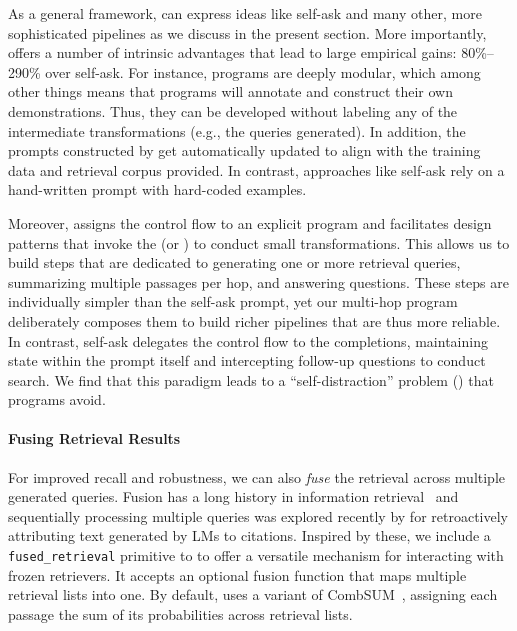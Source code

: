 As a general framework, \DSP can express ideas like self-ask and many other, more sophisticated pipelines as we discuss in the present section. More importantly, \DSP offers a number of intrinsic advantages that lead to large empirical gains: 80\%--290\% over self-ask. For instance, \DSP programs are deeply modular, which among other things means that \DSP programs will annotate and construct their own demonstrations. Thus, they can be developed without labeling any of the intermediate transformations (e.g., the queries generated). In addition, the \LM{} prompts constructed by \DSP get automatically updated to align with the training data and retrieval corpus provided. In contrast, approaches like self-ask rely on a hand-written prompt with hard-coded examples.

Moreover, \DSP assigns the control flow to an explicit program and facilitates design patterns that invoke the \LM{} (or \RM{}) to conduct small transformations. This allows us to build steps that are dedicated to generating one or more retrieval queries, summarizing multiple passages per hop, and answering questions. These steps are individually simpler than the self-ask prompt, yet our multi-hop \DSP program deliberately composes them to build richer pipelines that are thus more reliable. In contrast, self-ask delegates the control flow to the \LM{} completions, maintaining state within the prompt itself and intercepting follow-up questions to conduct search. We find that this paradigm leads to a ``self-distraction'' problem () that \DSP programs avoid.


\paragraph{Fusing Retrieval Results} For improved recall and robustness, we can also \textit{fuse} the retrieval across multiple generated queries. Fusion has a long history in information retrieval~\cite{fox1994combination,xue2013modeling,kurland2018fusion} and sequentially processing multiple queries was explored recently by \citet{gao2022attributed} for retroactively attributing text generated by LMs to citations. Inspired by these, we include a \texttt{fused\_retrieval} primitive to \DSP to offer a versatile mechanism for interacting with frozen retrievers. It accepts an optional fusion function that maps multiple retrieval lists into one. By default, \DSP uses a variant of CombSUM~\cite{fox1994combination}, assigning each passage the sum of its probabilities across retrieval lists.

